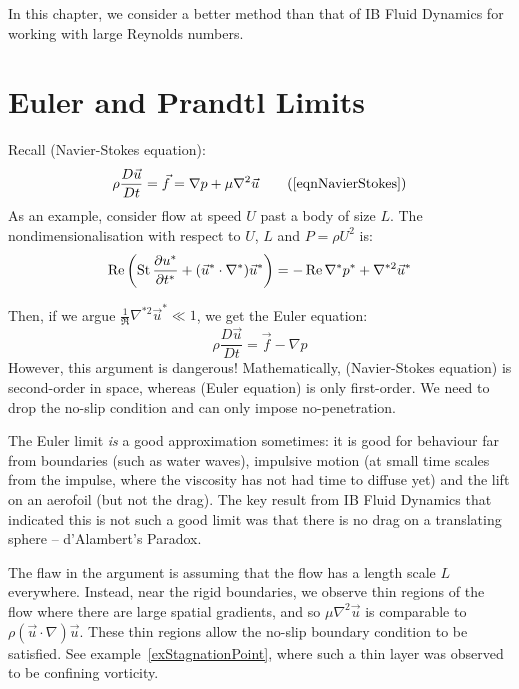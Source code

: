 \documentclass[../Main.tex]{subfiles}
\begin{document}
In this chapter, we consider a better method than that of IB Fluid Dynamics for working with large Reynolds numbers.
\section{Euler and Prandtl Limits}
Recall  (Navier-Stokes equation):
\begin{equation*}
    \rho \frac{D \vec u}{D t} = \vec f = \nabla p + \mu \nabla^2 \vec u
    \tag{\ref{eqnNavierStokes}}
\end{equation*}
As an example, consider flow at speed $U$ past a body of size $L$. The nondimensionalisation with respect to $U$, $L$ and $P = \rho U^2$ is:
\begin{equation*}
    \operatorname{Re} \left(\operatorname{St}\frac{\partial u^*}{\partial t^*} + (\vec{u}^* \cdot \nabla^*) \vec{u}^*\right) = -\operatorname{Re}\nabla^* p^* + \nabla^{* 2} \vec{u}^*
\end{equation*}

Then, if we argue $\frac{1}{\Re} \nabla^{*2} \vec u^* \ll 1$, we get the Euler equation:
\begin{equation}
    \rho \frac{D \vec u}{D t} = \vec f - \nabla p
    \label{eqnEuler}
\end{equation}
However, this argument is dangerous! Mathematically,  (Navier-Stokes equation) is second-order in space, whereas  (Euler equation) is only first-order. We need to drop the no-slip condition and can only impose no-penetration.

The Euler limit \textit{is} a good approximation sometimes: it is good for behaviour far from boundaries (such as water waves), impulsive motion (at small time scales from the impulse, where the viscosity has not had time to diffuse yet) and the lift on an aerofoil (but not the drag). The key result from IB Fluid Dynamics that indicated this is not such a good limit was that there is no drag on a translating sphere -- d'Alambert's Paradox.

The flaw in the argument is assuming that the flow has a length scale $L$ everywhere. Instead, near the rigid boundaries, we observe thin regions of the flow where there are large spatial gradients, and so $\mu \nabla^2 \vec u$ is comparable to $\rho (\vec{u} \cdot \nabla) \vec u$. These thin regions allow the no-slip boundary condition to be satisfied. See example~\ref{exStagnationPoint}, where such a thin layer was observed to be confining vorticity.

\end{document}
